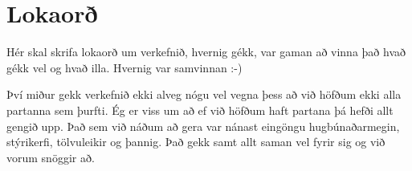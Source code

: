 \section{Lokaorð}
Hér skal skrifa lokaorð um verkefnið, hvernig gékk, var gaman að vinna það hvað gékk vel og hvað illa. Hvernig var samvinnan :-) \cite{brock}

Því miður gekk verkefnið ekki alveg nógu vel vegna þess að við höfðum ekki alla partanna sem þurfti. Ég er viss um að ef við höfðum haft partana þá hefði allt gengið upp. Það sem við náðum að gera var nánast eingöngu hugbúnaðarmegin, stýrikerfi, tölvuleikir og þannig. Það gekk samt allt saman vel fyrir sig og við vorum snöggir að.